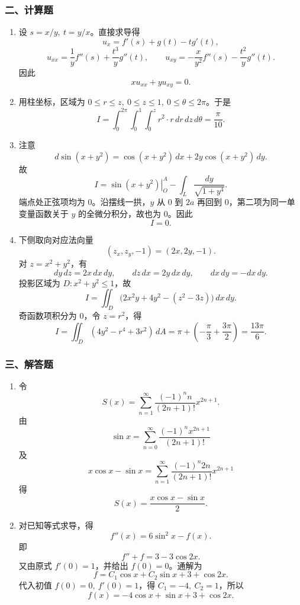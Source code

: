 \subsubsection*{二、计算题}
\begin{enumerate}
  \item 设 $s=x/y,\ t=y/x$。直接求导得
  \[
  u_x=f'(s)+g(t)-tg'(t),
  \]
  \[
  u_{xx}=\frac1y f''(s)+\frac{t^3}{y}g''(t),\qquad
  u_{xy}=-\frac{x}{y^2}f''(s)-\frac{t^2}{y}g''(t).
  \]
  因此
  \[
  xu_{xx}+yu_{xy}=0.
  \]
  \item 用柱坐标，区域为 $0\le r\le z,\ 0\le z\le1,\ 0\le\theta\le2\pi$。于是
  \[
  I=\int_0^{2\pi}\int_0^1\int_0^z r^2\cdot r\,dr\,dz\,d\theta
  =\frac{\pi}{10}.
  \]
  \item 注意
  \[
  d\sin(x+y^2)=\cos(x+y^2)\,dx+2y\cos(x+y^2)\,dy.
  \]
  故
  \[
  I=\left.\sin(x+y^2)\right|_{O}^{A}-\int_L\frac{dy}{\sqrt{1+y^4}}.
  \]
  端点处正弦项均为 $0$。沿摆线一拱，$y$ 从 $0$ 到 $2a$ 再回到 $0$，第二项为同一单变量函数关于 $y$ 的全微分积分，故也为 $0$。因此
  \[
  I=0.
  \]
  \item 下侧取向对应法向量
  \[
  (z_x,z_y,-1)=(2x,2y,-1).
  \]
  对 $z=x^2+y^2$，有
  \[
  dy\,dz=2x\,dx\,dy,\qquad dz\,dx=2y\,dx\,dy,\qquad dx\,dy=-dx\,dy.
  \]
  投影区域为 $D:x^2+y^2\le1$，故
  \[
  I=\iint_D\bigl(2x^2y+4y^2-(z^2-3z)\bigr)\,dx\,dy.
  \]
  奇函数项积分为 $0$，令 $z=r^2$，得
  \[
  I=\iint_D(4y^2-r^4+3r^2)\,dA
  =\pi+\left(-\frac{\pi}{3}+\frac{3\pi}{2}\right)
  =\frac{13\pi}{6}.
  \]
\end{enumerate}

\subsubsection*{三、解答题}
\begin{enumerate}
  \item 令
  \[
  S(x)=\sum_{n=1}^{\infty}\frac{(-1)^n n}{(2n+1)!}x^{2n+1}.
  \]
  由
  \[
  \sin x=\sum_{n=0}^{\infty}\frac{(-1)^n x^{2n+1}}{(2n+1)!}
  \]
  及
  \[
  x\cos x-\sin x=\sum_{n=1}^{\infty}\frac{(-1)^n 2n}{(2n+1)!}x^{2n+1}
  \]
  得
  \[
  S(x)=\frac{x\cos x-\sin x}{2}.
  \]
  \item 对已知等式求导，得
  \[
  f''(x)=6\sin^2x-f(x).
  \]
  即
  \[
  f''+f=3-3\cos2x.
  \]
  又由原式 $f'(0)=1$，并给出 $f(0)=0$。通解为
  \[
  f=C_1\cos x+C_2\sin x+3+\cos2x.
  \]
  代入初值 $f(0)=0,\ f'(0)=1$，得 $C_1=-4,\ C_2=1$，所以
  \[
  f(x)=-4\cos x+\sin x+3+\cos2x.
  \]
\end{enumerate}

